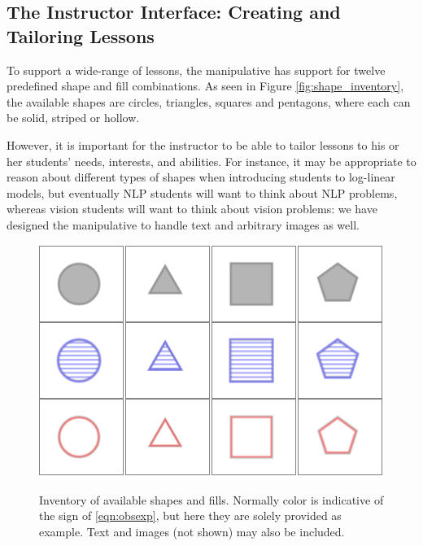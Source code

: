 \documentclass[11pt,letterpaper]{article}
\begin{document}
\subsection{The Instructor Interface: Creating and Tailoring Lessons}\label{sec:tailoring}

To support a wide-range of lessons, the manipulative has support for twelve predefined shape and fill combinations.
As seen in Figure \ref{fig:shape_inventory}, the available shapes are circles, triangles, squares and pentagons,
where each can be solid, striped or hollow.

However, it is important for the instructor to be able to tailor lessons to his or her students' needs, 
interests, and abilities. For instance, it may be appropriate to reason about different types of shapes
when introducing students to log-linear models, but eventually NLP students will want to think about 
NLP problems, whereas vision students will want to think about vision problems: we have designed the manipulative to handle text
and arbitrary images as well.

\begin{figure}[t]
\begin{center}
\centering
\includegraphics[scale=.5]{images/different_shapes_fills3x4.PNG}
\caption{Inventory of available shapes and fills. Normally color is indicative of 
the sign of \eqref{eqn:obsexp}, but here they are solely provided as example. 
Text and images (not shown) may also be included.}
\label{fig:shape_inventory}
\label{fig:inventory}
\end{center}
\end{figure}
\end{document}

